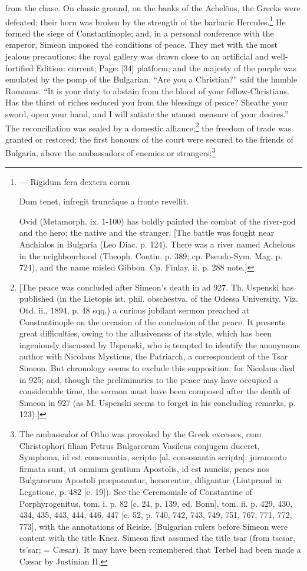 from the chase. On classic ground, on the banks of the Achelöus, the Greeks were defeated; their horn was broken by the strength of the barbaric Hercules.\footnote{\texthebrew{—} Rigidum fera dextera cornu

Dum tenet, infregit truncâque a fronte revellit.

Ovid (Metamorph. ix. 1-100) has boldly painted the combat of the river-god and the hero; the native and the stranger. [The battle was fought near Anchialos in Bulgaria (Leo Diac. p. 124). There was a river named Achelous in the neighbourhood (Theoph. Contin. p. 389; cp. Pseudo-Sym. Mag. p. 724), and the name misled Gibbon. Cp. Finlay, ii. p. 288 note.]} He formed the siege of Constantinople; and, in a personal conference with the emperor, Simeon imposed the conditions of peace. They met with the most jealous precautions; the royal gallery was drawn close to an artificial and well-fortified Edition: current; Page: [34] platform; and the majesty of the purple was emulated by the pomp of the Bulgarian. \texthebrew{“}Are you a Christian?\texthebrew{}” said the humble Romanus. \texthebrew{“}It is your duty to abstain from the blood of your fellow-Christians. Has the thirst of riches seduced you from the blessings of peace? Sheathe your sword, open your hand, and I will satiate the utmost measure of your desires.\texthebrew{}” The reconciliation was sealed by a domestic alliance;\footnote{[The peace was concluded after Simeon\texthebrew{}’s death in ad 927. Th. Uspenski has published (in the Lietopis ist. phil. obschestva, of the Odessa University. Viz. Otd. ii., 1894, p. 48 sqq.) a curious jubilant sermon preached at Constantinople on the occasion of the conclusion of the peace. It presents great difficulties, owing to the allusiveness of its style, which has been ingeniously discussed by Uspenski, who is tempted to identify the anonymous author with Nicolaus Mysticus, the Patriarch, a correspondent of the Tsar Simeon. But chronology seems to exclude this supposition; for Nicolaus died in 925; and, though the preliminaries to the peace may have occupied a considerable time, the sermon must have been composed after the death of Simeon in 927 (as M. Uspenski seems to forget in his concluding remarks, p. 123).]} the freedom of trade was granted or restored; the first honours of the court were secured to the friends of Bulgaria, above the ambassadors of enemies or strangers;\footnote{The ambassador of Otho was provoked by the Greek excesses, cum Christophori filiam Petrus Bulgarorum Vasileus conjugem duceret, Symphona, id est consonantia, scripto [al. consonantia scripta]. juramento firmata sunt, ut omnium gentium Apostolis, id est nunciis, penes nos Bulgarorum Apostoli præponantur, honorentur, diligantur (Liutprand in Legatione, p. 482 [c. 19]). See the Ceremoniale of Constantine of Porphyrogenitus, tom. i. p. 82 [c. 24, p. 139, ed. Bonn], tom. ii. p. 429, 430, 434, 435, 443, 444, 446, 447 [c. 52, p. 740, 742, 743, 749, 751, 767, 771, 772, 773], with the annotations of Reiske. [Bulgarian rulers before Simeon were content with the title Knez. Simeon first assumed the title tsar (from tsesar, ts\texthebrew{}’sar; = Cæsar). It may have been remembered that Terbel had been made a Cæsar by Justinian II. }
